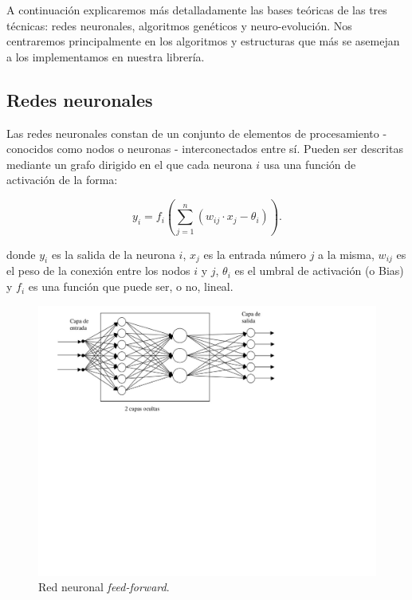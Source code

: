 \documentclass[11pt]{article}
\begin{document}
\begin{titlepage}
 A continuaci\'on explicaremos m\'as detalladamente las bases te\'oricas de las tres t\'ecnicas: redes neuronales, algoritmos gen\'eticos y neuro-evoluci\'on. Nos centraremos principalmente en los algoritmos y estructuras que m\'as se asemejan a los implementamos en nuestra librer\'ia.
\subsection{Redes neuronales}
\label{sec-2-1}

  \label{basTeoRedes}

Las redes neuronales constan de un conjunto de elementos de procesamiento - conocidos como nodos o neuronas - interconectados entre s\'i. Pueden ser descritas mediante un grafo dirigido en el que cada neurona  \(i\) usa una funci\'on de activaci\'on de la forma:

\begin{equation}\label{eqSalidaNeu}
  y_i=f_i(\sum_{j=1}^n (w_{ij} \cdot x_j - \theta_i)).
\end{equation}

donde \(y_i\) es la salida de la neurona \(i\), \(x_j\) es la entrada n\'umero \(j\) a la misma, \(w_{ij}\) es el peso de la conexi\'on entre los nodos \(i\) y \(j\), \(\theta_i\) es el umbral de activaci\'on (o Bias) y \(f_i\) es una funci\'on que puede ser, o no, lineal.

\begin{figure}[htb]
\centering
\includegraphics[trim= 0.5cm 22cm 10cm 0cm, clip, width=15cm]{./img/feed-forward.jpg}
\caption{\label{figFeedForward}Red neuronal \emph{feed-forward}.}
\end{figure}


\end{titlepage}
\end{document}
